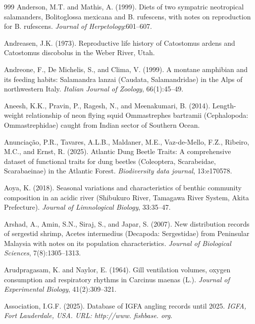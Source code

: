 \begin{thebibliography}{999}
Anderson, M.T. and Mathis, A. (1999). Diets of two sympatric neotropical salamanders, Bolitoglossa mexicana and B. rufescens, with notes on reproduction for B. rufescens. \textit{Journal of Herpetology}:601--607.

Andreasen, J.K. (1973). Reproductive life history of Catostomus ardens and Catostomus discobolus in the Weber River, Utah.

Andreone, F., De Michelis, S., and Clima, V. (1999). A montane amphibian and its feeding habits: Salamandra lanzai (Caudata, Salamandridae) in the Alps of northwestern Italy. \textit{Italian Journal of Zoology}, 66(1):45--49.

Aneesh, K.K., Pravin, P., Ragesh, N., and Meenakumari, B. (2014). Length-weight relationship of neon flying squid Ommastrephes bartramii (Cephalopoda: Ommastrephidae) caught from Indian sector of Southern Ocean.

Anuncia{\c{c}}{\~a}o, P.R., Tavares, A.L.B., Maldaner, M.E., Vaz-de-Mello, F.Z., Ribeiro, M.C., and Ernst, R. (2025). Atlantic Dung Beetle Traits: A comprehensive dataset of functional traits for dung beetles (Coleoptera, Scarabeidae, Scarabaeinae) in the Atlantic Forest. \textit{Biodiversity data journal}, 13:e170578.

Aoya, K. (2018). Seasonal variations and characteristics of benthic community composition in an acidic river (Shibukuro River, Tamagawa River System, Akita Prefecture). \textit{Journal of Limnological Biology}, 33:35--47.

Arshad, A., Amin, S.N., Siraj, S., and Japar, S. (2007). New distribution records of sergestid shrimp, Acetes intermedius (Decapoda: Sergestidae) from Peninsular Malaysia with notes on its population characteristics. \textit{Journal of Biological Sciences}, 7(8):1305--1313.

Arudpragasam, K. and Naylor, E. (1964). Gill ventilation volumes, oxygen consumption and respiratory rhythms in Carcinus maenas (L.). \textit{Journal of Experimental Biology}, 41(2):309--321.

Association, I.G.F. (2025). Database of IGFA angling records until 2025. \textit{IGFA, Fort Lauderdale, USA. URL: http://www. fishbase. org}.


\end{thebibliography}
